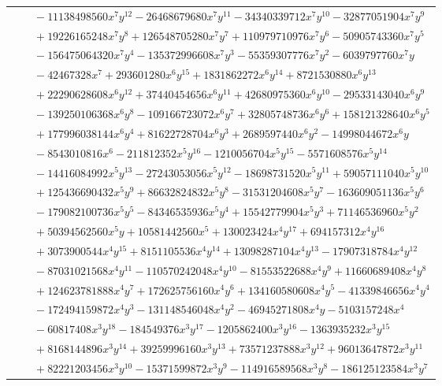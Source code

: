 \documentclass[11pt]{article}
\begin{document}
\begin{longtable}{@{}ll@{}}
 & $\quad -11138498560x^{7}y^{12}-26468679680x^{7}y^{11}-34340339712x^{7}y^{10}-32877051904x^{7}y^{9}$\\
 & $\quad +19226165248x^{7}y^{8}+126548705280x^{7}y^{7}+110979710976x^{7}y^{6}-50905743360x^{7}y^{5}$\\
 & $\quad -156475064320x^{7}y^{4}-135372996608x^{7}y^{3}-55359307776x^{7}y^{2}-6039797760x^{7}y$\\
 & $\quad -42467328x^{7}+293601280x^{6}y^{15}+1831862272x^{6}y^{14}+8721530880x^{6}y^{13}$\\
 & $\quad +22290628608x^{6}y^{12}+37440454656x^{6}y^{11}+42680975360x^{6}y^{10}-29533143040x^{6}y^{9}$\\
 & $\quad -139250106368x^{6}y^{8}-109166723072x^{6}y^{7}+32805748736x^{6}y^{6}+158121328640x^{6}y^{5}$\\
 & $\quad +177996038144x^{6}y^{4}+81622728704x^{6}y^{3}+2689597440x^{6}y^{2}-14998044672x^{6}y$\\
 & $\quad -8543010816x^{6}-211812352x^{5}y^{16}-1210056704x^{5}y^{15}-5571608576x^{5}y^{14}$\\
 & $\quad -14416084992x^{5}y^{13}-27243053056x^{5}y^{12}-18698731520x^{5}y^{11}+59057111040x^{5}y^{10}$\\
 & $\quad +125436690432x^{5}y^{9}+86632824832x^{5}y^{8}-31531204608x^{5}y^{7}-163609051136x^{5}y^{6}$\\
 & $\quad -179082100736x^{5}y^{5}-84346535936x^{5}y^{4}+15542779904x^{5}y^{3}+71146536960x^{5}y^{2}$\\
 & $\quad +50394562560x^{5}y+10581442560x^{5}+130023424x^{4}y^{17}+694157312x^{4}y^{16}$\\
 & $\quad +3073900544x^{4}y^{15}+8151105536x^{4}y^{14}+13098287104x^{4}y^{13}-17907318784x^{4}y^{12}$\\
 & $\quad -87031021568x^{4}y^{11}-110570242048x^{4}y^{10}-81553522688x^{4}y^{9}+11660689408x^{4}y^{8}$\\
 & $\quad +124623781888x^{4}y^{7}+172625756160x^{4}y^{6}+134160580608x^{4}y^{5}-41339846656x^{4}y^{4}$\\
 & $\quad -172494159872x^{4}y^{3}-131148546048x^{4}y^{2}-46945271808x^{4}y-5103157248x^{4}$\\
 & $\quad -60817408x^{3}y^{18}-184549376x^{3}y^{17}-1205862400x^{3}y^{16}-1363935232x^{3}y^{15}$\\
 & $\quad +8168144896x^{3}y^{14}+39259996160x^{3}y^{13}+73571237888x^{3}y^{12}+96013647872x^{3}y^{11}$\\
 & $\quad +82221203456x^{3}y^{10}-15371599872x^{3}y^{9}-114916589568x^{3}y^{8}-186125123584x^{3}y^{7}$\\

\end{longtable}
\end{document}
